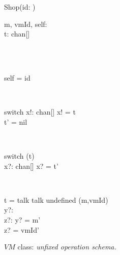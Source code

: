 \begin{figure}[H]
\centering
\begin{class}{Shop(id: \integer)}
\\
\begin{state}
m, vmId, self: \integer
\\t: chan[\integer \times \integer]
\end{state} 
\\
\begin{init}
\\self = id
\end{init} 
\\
\begin{op}{switch}
x!:  chan[\integer \times \integer]
\ST
x! = t
\\t' = nil
\end{op}
\\
\begin{op}{switch}
\Delta (t)
\\x?:  chan[\integer \times \integer]
\ST
x? = t'
\end{op}
\\
\begin{op}{ t = talk  talk  undefined}
\Delta (m,vmId)
\\y?: \integer
\\z?: \integer
\ST
y? = m'
\\z? = vmId'
\end{op}
\end{class}
\caption{$VM$ class: \textit{unfixed operation schema.}}
\label{fig_oz_unfixed_operation_schema_shop}
\end{figure}